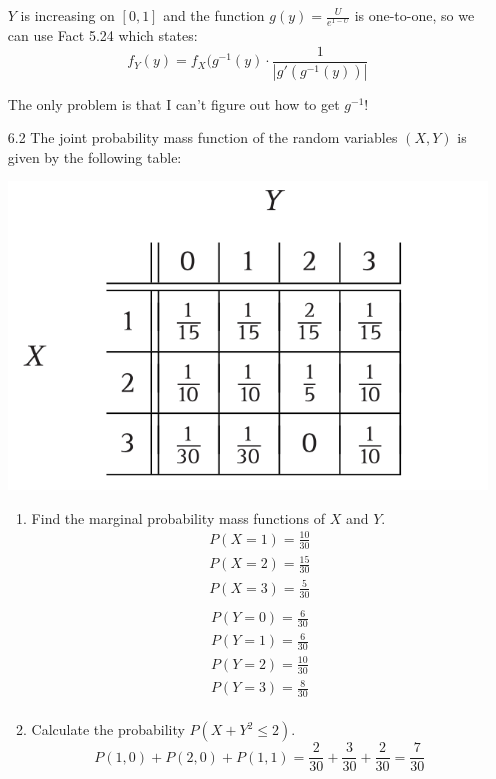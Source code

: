 \documentclass[10pt]{article}
\begin{document}
\begin{itemize}
		$Y$ is increasing on $[0,1]$ and the function
		$g(y) = \frac{U}{e^{1-U}}$ is one-to-one, so we can use Fact
		5.24 which states:
		\[ f_Y(y) = f_X(g^{-1}(y) \cdot \frac{1}{|g'(g^{-1}(y))|}  \]

		The only problem is that I can't figure out how to get $g^{-1}$!
\newpage
	\item[6.2] The joint probability mass function of the random variables $(X, Y)$ is given by the following table:

\begin{center}
\includegraphics[max width=\textwidth]{images/exercise-6.2.png}

\end{center}

	\begin{enumerate}
		\item  Find the marginal probability mass functions of $X$ and $Y$.
			\begin{align*}
				P(X=1)=\frac{10}{30} \\
				P(X=2)=\frac{15}{30} \\
				P(X=3)=\frac{5}{30} \\
			\end{align*}
			\begin{align*}
				P(Y=0)=\frac{6}{30} \\
				P(Y=1)=\frac{6}{30} \\
				P(Y=2)=\frac{10}{30} \\
				P(Y=3)=\frac{8}{30} \\
			\end{align*}
		\item  Calculate the probability $P\left(X+Y^{2} \leq 2\right)$.
			\[ P(1,0) + P(2,0) + P(1,1) = \frac{2}{30} + \frac{3}{30} +  \frac{2}{30} = \frac{7}{30}  \]
	\end{enumerate}


\end{itemize}
\end{document}
